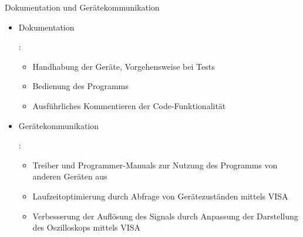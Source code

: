 \begin{frame}{Dokumentation und Gerätekommunikation  }

\begin{itemize}
	
	\item Dokumentation \uncover<2-> {: 
		\begin{itemize}
			\item Handhabung der Geräte, Vorgehensweise bei Tests
			\item Bedienung des Programms 
			\item Ausführliches Kommentieren der Code-Funktionalität
		\end{itemize}
		}
	\item Gerätekommunikation \uncover<3-> {:
		\begin{itemize}
			\item Treiber und Programmer-Manuals zur Nutzung des Programms von anderen Geräten aus 
			\item Laufzeitoptimierung durch Abfrage von Gerätezuständen mittels VISA
			\item Verbesserung der Auflösung des Signals durch Anpassung der Darstellung des Oszilloskops mittels VISA
		\end{itemize}
		}
	
	
\end{itemize}

\end{frame}



